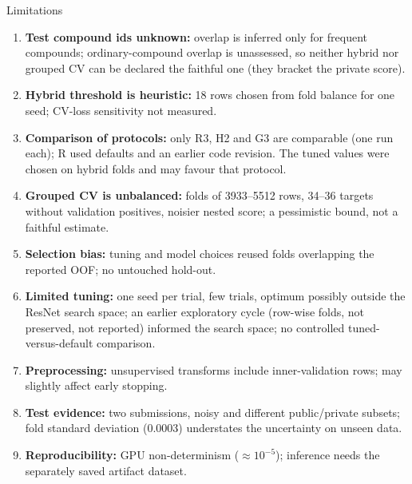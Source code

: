 \documentclass[aspectratio=169,10pt]{beamer}
\begin{document}
\begin{frame}{Limitations}
\small
\begin{enumerate}\setlength{\itemsep}{0pt}
  \item \textbf{Test compound ids unknown:} overlap is inferred only for frequent compounds; ordinary-compound overlap is unassessed, so neither hybrid nor grouped CV can be declared the faithful one (they bracket the private score).
  \item \textbf{Hybrid threshold is heuristic:} 18 rows chosen from fold balance for one seed; CV-loss sensitivity not measured.
  \item \textbf{Comparison of protocols:} only R3, H2 and G3 are comparable (one run each); R used defaults and an earlier code revision. The tuned values were chosen on hybrid folds and may favour that protocol.
  \item \textbf{Grouped CV is unbalanced:} folds of 3933--5512 rows, 34--36 targets without validation positives, noisier nested score; a pessimistic bound, not a faithful estimate.
  \item \textbf{Selection bias:} tuning and model choices reused folds overlapping the reported OOF; no untouched hold-out.
  \item \textbf{Limited tuning:} one seed per trial, few trials, optimum possibly outside the ResNet search space; an earlier exploratory cycle (row-wise folds, not preserved, not reported) informed the search space; no controlled tuned-versus-default comparison.
  \item \textbf{Preprocessing:} unsupervised transforms include inner-validation rows; may slightly affect early stopping.
  \item \textbf{Test evidence:} two submissions, noisy and different public/private subsets; fold standard deviation (0.0003) understates the uncertainty on unseen data.
  \item \textbf{Reproducibility:} GPU non-determinism ($\approx10^{-5}$); inference needs the separately saved artifact dataset.
\end{enumerate}
\end{frame}
\end{document}
